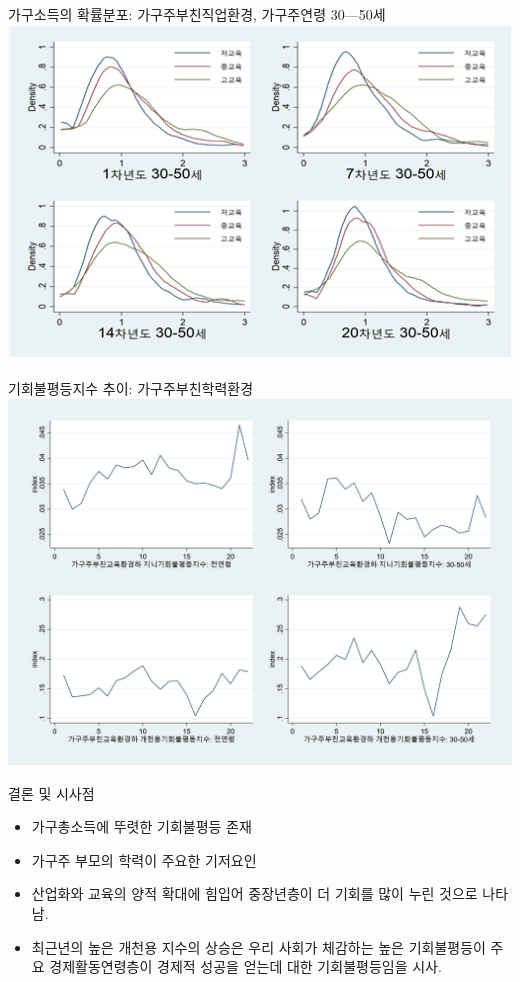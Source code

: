 \documentclass[aspectratio=169,xcolor=dvipsnames,handout]{beamer}
\begin{document}
\begin{frame}{가구소득의 확률분포: 가구주부친직업환경, 가구주연령 30---50세}
    \centering
    \includegraphics[scale=.5]{figure/klips_pdf4_byjob.png}
\end{frame}

\begin{frame}{기회불평등지수 추이: 가구주부친학력환경}
    \centering
    \includegraphics[width=.6\textwidth]{figure/incn1m_edugrp_index.png}
\end{frame}

\begin{frame}{결론 및 시사점}
  \begin{itemize}
    \item 가구총소득에 뚜렷한 기회불평등 존재
    \item 가구주 부모의 학력이 주요한 기저요인
    \item 산업화와 교육의 양적 확대에 힘입어 중장년층이 더 기회를 많이 누린 것으로 나타남.
    \item 최근년의 높은 개천용 지수의 상승은 우리 사회가 체감하는 높은 기회불평등이 주요 경제활동연령층이 경제적 성공을 얻는데 대한 기회불평등임을 시사.
  \end{itemize}
\end{frame}
\end{document}
